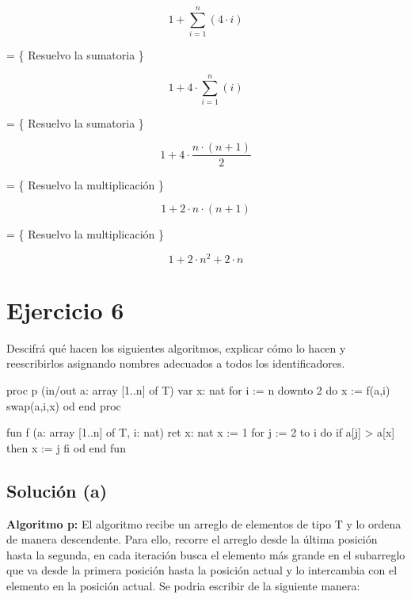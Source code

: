 \documentclass{article}
\begin{document}
\begin{equation*}
  1 + \sum_{i=1}^{n} \left(  4 \cdot i \right)
\end{equation*}

= \{ Resuelvo la sumatoria \}

\begin{equation*}
  1 + 4 \cdot \sum_{i=1}^{n} \left(  i \right)
\end{equation*}

= \{ Resuelvo la sumatoria \}

\begin{equation*}
  1 + 4 \cdot \frac{n \cdot (n+1)}{2}
\end{equation*}

= \{ Resuelvo la multiplicación \}

\begin{equation*}
  1 + 2 \cdot n \cdot (n+1)
\end{equation*}

= \{ Resuelvo la multiplicación \}

\begin{equation*}
  1 + 2 \cdot n^2 + 2 \cdot n
\end{equation*}

\section{Ejercicio 6}
Descifrá qué hacen los siguientes algoritmos, explicar cómo lo hacen y reescribirlos asignando nombres adecuados a todos los identificadores.

\begin{codebox}
\begin{pascallike}
proc p (in/out a: array [1..n] of T)
    var x: nat
    for i := n downto 2 do
    x := f(a,i)
    swap(a,i,x)
    od
end proc
\end{pascallike}
\end{codebox}

\begin{codebox}
\begin{pascallike}
fun f (a: array [1..n] of T, i: nat) ret x: nat
    x := 1
    for j := 2 to i do
    if a[j] > a[x] then
        x := j
    fi
    od
end fun
\end{pascallike}
\end{codebox}

\subsection{Solución (a)}
\textbf{Algoritmo p:} El algoritmo recibe un arreglo de elementos de tipo T y lo ordena de manera descendente. Para ello, recorre el arreglo desde la última posición hasta la segunda, en cada iteración busca el elemento más grande en el subarreglo que va desde la primera posición hasta la posición actual y lo intercambia con el elemento en la posición actual.
Se podria escribir de la siguiente manera:
\end{document}
